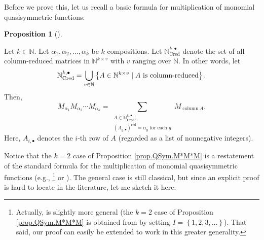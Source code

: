 \documentclass[numbers=enddot,12pt,final,onecolumn,notitlepage,abstracton]{scrartcl}%
\theoremstyle{definition}
\newtheorem{prop}[theo]{Proposition}
\newenvironment{proposition}[1][]
{\begin{prop}[#1]\begin{leftbar}}
{\end{leftbar}\end{prop}}
\let\sumnonlimits\sum
\let\cupnonlimits\bigcup
\renewcommand{\sum}{\sumnonlimits\limits}
\renewcommand{\bigcup}{\cupnonlimits\limits}
\begin{document}
Before we prove this, let us recall a basic formula for multiplication of
monomial quasisymmetric functions:

\begin{proposition}
\label{prop.QSym.M*M*M}Let $k\in\mathbb{N}$. Let $\alpha_{1},\alpha_{2}%
,\ldots,\alpha_{k}$ be $k$ compositions. Let $\mathbb{N}_{\operatorname*{Cred}%
}^{k,\bullet}$ denote the set of all column-reduced matrices in $\mathbb{N}%
^{k\times v}$ with $v$ ranging over $\mathbb{N}$. In other words, let
\[
\mathbb{N}_{\operatorname{Cred}}^{k, \bullet} = \bigcup\limits_{v
\in\mathbb{N}} \left\{  A \in\mathbb{N}^{k \times v} \mid A \text{ is
column-reduced} \right\}  .
\]
Then,%
\[
M_{\alpha_{1}}M_{\alpha_{2}}\cdots M_{\alpha_{k}}=\sum_{\substack{A\in
\mathbb{N}_{\operatorname*{Cred}}^{k,\bullet};\\\left(  A_{g,\bullet}\right)
^{\operatorname*{red}}=\alpha_{g}\text{ for each }g}}M_{\operatorname*{column}%
A}.
\]
Here, $A_{i,\bullet}$ denotes the $i$-th row of $A$ (regarded as a list of
nonnegative integers).
\end{proposition}

Notice that the $k=2$ case of Proposition \ref{prop.QSym.M*M*M} is a
restatement of the standard formula for the multiplication of monomial
quasisymmetric functions (e.g., \cite[Proposition 5.1.3]{Reiner}%
\footnote{Actually, \cite[Proposition 5.1.3]{Reiner} is slightly more general
(the $k=2$ case of Proposition \ref{prop.QSym.M*M*M} is obtained from
\cite[Proposition 5.1.3]{Reiner} by setting $I=\left\{  1,2,3,\ldots\right\}
$). That said, our proof can easily be extended to work in this greater
generality.} or \cite[\S 11.26]{HazeWitt}). The general case is still
classical, but since an explicit proof is hard to locate in the literature,
let me sketch it here.
\end{document}
